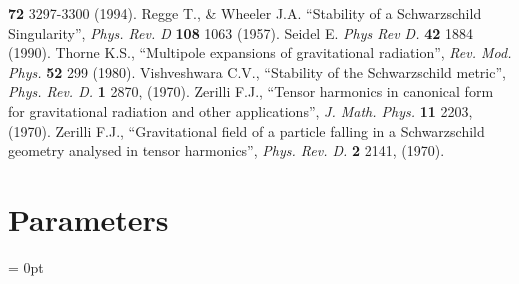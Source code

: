\documentclass{article}
\newlength{\tableWidth} \newlength{\maxVarWidth} \newlength{\paraWidth} \newlength{\descWidth}
\begin{document}
\begin{thebibliography}{9}
                        {\bf 72} 
                        3297-3300 
                        (1994).
         Regge T., \& Wheeler J.A. 
                        ``Stability of a Schwarzschild Singularity'', 
                        {\em Phys. Rev. D} 
                        {\bf 108} 
                        1063 
                        (1957).
      Seidel E. 
                        {\em Phys Rev D.} 
                        {\bf 42} 
                        1884 
                        (1990).
      Thorne K.S., 
                        ``Multipole expansions of gravitational radiation'', 
                        {\em Rev. Mod. Phys.} 
                        {\bf 52} 
                        299 
                        (1980).
          Vishveshwara C.V., 
                        ``Stability of the Schwarzschild metric'',
                        {\em Phys. Rev. D.} 
                        {\bf 1} 
                        2870, 
                        (1970).
    Zerilli F.J., 
                        ``Tensor harmonics in canonical form for gravitational 
                          radiation and other applications'', 
                        {\em J. Math. Phys.} 
                        {\bf 11} 
                        2203, 
                        (1970).
     Zerilli F.J., 
                        ``Gravitational field of a particle falling 
                          in a Schwarzschild geometry analysed in 
                          tensor harmonics'',
                        {\em Phys. Rev. D.} 
                        {\bf 2} 
                        2141, 
                        (1970).
\end{thebibliography}




\section{Parameters} 


\parskip = 0pt

\setlength{\tableWidth}{160mm}

\setlength{\paraWidth}{\tableWidth}
\setlength{\descWidth}{\tableWidth}
\settowidth{\maxVarWidth}{make\_interpolator\_warnings\_fatal}

\addtolength{\paraWidth}{-\maxVarWidth}
\addtolength{\paraWidth}{-\columnsep}
\addtolength{\paraWidth}{-\columnsep}
\addtolength{\paraWidth}{-\columnsep}
\end{document}
